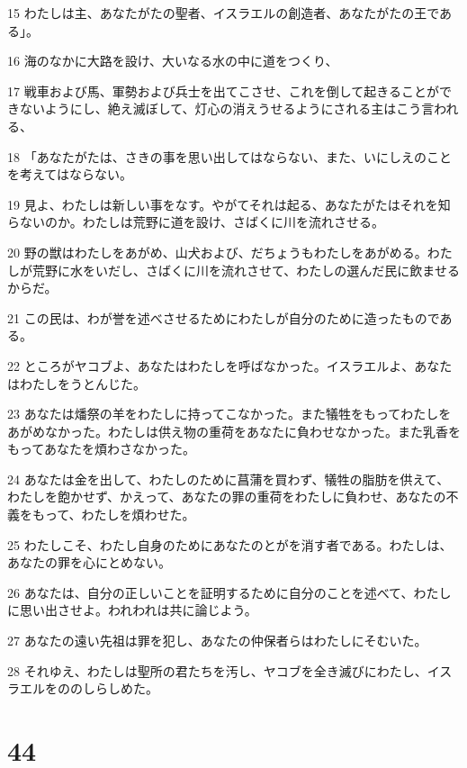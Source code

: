 \par 15 わたしは主、あなたがたの聖者、イスラエルの創造者、あなたがたの王である」。
\par 16 海のなかに大路を設け、大いなる水の中に道をつくり、
\par 17 戦車および馬、軍勢および兵士を出てこさせ、これを倒して起きることができないようにし、絶え滅ぼして、灯心の消えうせるようにされる主はこう言われる、
\par 18 「あなたがたは、さきの事を思い出してはならない、また、いにしえのことを考えてはならない。
\par 19 見よ、わたしは新しい事をなす。やがてそれは起る、あなたがたはそれを知らないのか。わたしは荒野に道を設け、さばくに川を流れさせる。
\par 20 野の獣はわたしをあがめ、山犬および、だちょうもわたしをあがめる。わたしが荒野に水をいだし、さばくに川を流れさせて、わたしの選んだ民に飲ませるからだ。
\par 21 この民は、わが誉を述べさせるためにわたしが自分のために造ったものである。
\par 22 ところがヤコブよ、あなたはわたしを呼ばなかった。イスラエルよ、あなたはわたしをうとんじた。
\par 23 あなたは燔祭の羊をわたしに持ってこなかった。また犠牲をもってわたしをあがめなかった。わたしは供え物の重荷をあなたに負わせなかった。また乳香をもってあなたを煩わさなかった。
\par 24 あなたは金を出して、わたしのために菖蒲を買わず、犠牲の脂肪を供えて、わたしを飽かせず、かえって、あなたの罪の重荷をわたしに負わせ、あなたの不義をもって、わたしを煩わせた。
\par 25 わたしこそ、わたし自身のためにあなたのとがを消す者である。わたしは、あなたの罪を心にとめない。
\par 26 あなたは、自分の正しいことを証明するために自分のことを述べて、わたしに思い出させよ。われわれは共に論じよう。
\par 27 あなたの遠い先祖は罪を犯し、あなたの仲保者らはわたしにそむいた。
\par 28 それゆえ、わたしは聖所の君たちを汚し、ヤコブを全き滅びにわたし、イスラエルをののしらしめた。

\chapter{44}

